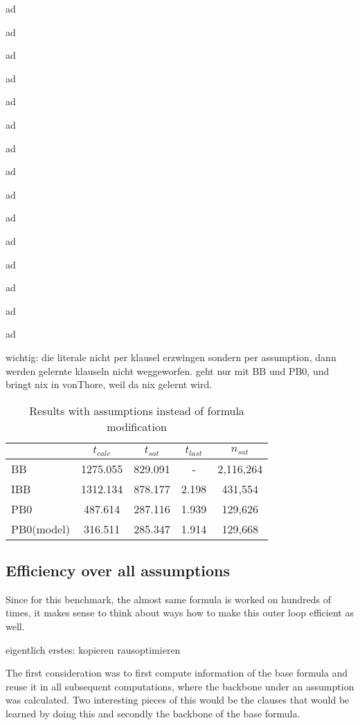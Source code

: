ad

ad

ad

ad

ad

ad

ad

ad

ad

ad

ad

ad

ad

ad

ad

wichtig: die literale nicht per klausel erzwingen sondern per assumption, dann werden gelernte klauseln nicht weggeworfen. geht nur mit BB und PB0, und bringt nix in vonThore, weil da nix gelernt wird.

\begin{wraptable}{l}{8cm}
\begin{tabular}{l| c c c c}
& $t_{calc}$ & $t_{sat}$ & $t_{last}$ & $n_{sat}$ \\
\hline
BB & 1275.055 & 829.091 & - & 2,116,264 \\
IBB & 1312.134 & 878.177 & 2.198 & 431,554 \\
PB0 & 487.614 & 287.116 & 1.939 & 129,626 \\
PB0(model) & 316.511 & 285.347 & 1.914 & 129,668 \\
\end{tabular}
\caption{Results with assumptions instead of formula modification}
\label{tab:pofAssump}
\end{wraptable}




\subsection{Efficiency over all assumptions}
Since for this benchmark, the almost same formula is worked on hundreds of times, it makes sense to think about ways how to make this outer loop efficient as well.

eigentlich erstes: kopieren rausoptimieren

The first consideration was to first compute information of the base formula and reuse it in all subsequent computations, where the backbone under an assumption was calculated. Two interesting pieces of this would be the clauses that would be learned by doing this and secondly the backbone of the base formula.

